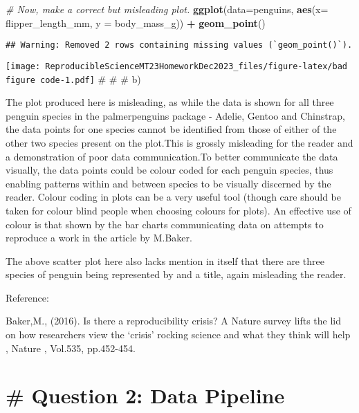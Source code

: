 \documentclass[
]{article}
\newenvironment{Shaded}{\begin{snugshade}}{\end{snugshade}}
\newcommand{\AttributeTok}[1]{\textcolor[rgb]{0.13,0.29,0.53}{#1}}
\newcommand{\CommentTok}[1]{\textcolor[rgb]{0.56,0.35,0.01}{\textit{#1}}}
\newcommand{\FunctionTok}[1]{\textcolor[rgb]{0.13,0.29,0.53}{\textbf{#1}}}
\newcommand{\NormalTok}[1]{#1}
\newcommand{\SpecialCharTok}[1]{\textcolor[rgb]{0.81,0.36,0.00}{\textbf{#1}}}
\begin{document}
\begin{Shaded}
\begin{Highlighting}[]
\CommentTok{\# Now, make a correct but misleading plot.}
\FunctionTok{ggplot}\NormalTok{(}\AttributeTok{data=}\NormalTok{penguins, }\FunctionTok{aes}\NormalTok{(}\AttributeTok{x=}\NormalTok{ flipper\_length\_mm, }\AttributeTok{y =}\NormalTok{ body\_mass\_g)) }\SpecialCharTok{+}
  \FunctionTok{geom\_point}\NormalTok{() }
\end{Highlighting}
\end{Shaded}

\begin{verbatim}
## Warning: Removed 2 rows containing missing values (`geom_point()`).
\end{verbatim}

\texttt{[image: ReproducibleScienceMT23HomeworkDec2023\_files/figure-latex/bad figure code-1.pdf]}
\# \# \# b)

The plot produced here is misleading, as while the data is shown for all
three penguin species in the palmerpenguins package - Adelie, Gentoo and
Chinstrap, the data points for one species cannot be identified from
those of either of the other two species present on the plot.This is
grossly misleading for the reader and a demonstration of poor data
communication.To better communicate the data visually, the data points
could be colour coded for each penguin species, thus enabling patterns
within and between species to be visually discerned by the reader.
Colour coding in plots can be a very useful tool (though care should be
taken for colour blind people when choosing colours for plots). An
effective use of colour is that shown by the bar charts communicating
data on attempts to reproduce a work in the article by M.Baker.

The above scatter plot here also lacks mention in itself that there are
three species of penguin being represented by and a title, again
misleading the reader.

Reference:

Baker,M., (2016). Is there a reproducibility crisis? A Nature survey
lifts the lid on how researchers view the `crisis' rocking science and
what they think will help , Nature , Vol.535, pp.452-454.

\hypertarget{question-2-data-pipeline}{%
\section{\# Question 2: Data Pipeline}\label{question-2-data-pipeline}}
\end{document}
